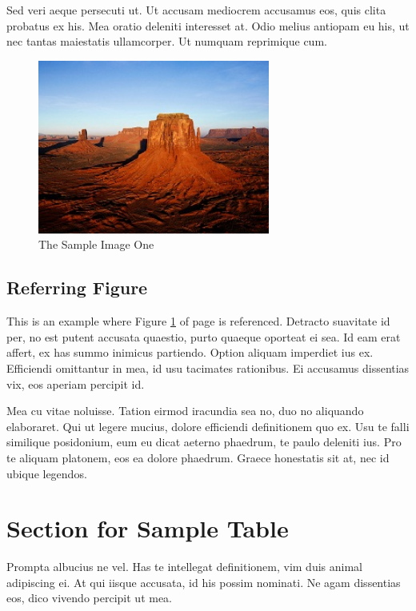Sed veri aeque persecuti ut. Ut accusam mediocrem accusamus eos, quis clita probatus ex his. Mea oratio deleniti interesset at. Odio melius antiopam eu his, ut nec tantas maiestatis ullamcorper. Ut numquam reprimique cum.

\begin{figure}[tbh] %
\begin{center}
	\includegraphics[width = 3in]{images/sampleImage1.jpg}
	\caption{The Sample Image One} %
	\label{figSample1} %
\end{center}
\end{figure}

\subsection{Referring Figure}
This is an example where Figure \ref{figSample1} of page \pageref{figSample1} is referenced. Detracto suavitate id per, no est putent accusata quaestio, purto quaeque oporteat ei sea. Id eam erat affert, ex has summo inimicus partiendo. Option aliquam imperdiet ius ex. Efficiendi omittantur in mea, id usu tacimates rationibus. Ei accusamus dissentias vix, eos aperiam percipit id.

Mea cu vitae noluisse. Tation eirmod iracundia sea no, duo no aliquando elaboraret. Qui ut legere mucius, dolore efficiendi definitionem quo ex. Usu te falli similique posidonium, eum eu dicat aeterno phaedrum, te paulo deleniti ius. Pro te aliquam platonem, eos ea dolore phaedrum. Graece honestatis sit at, nec id ubique legendos.

\section{Section for Sample Table}
Prompta albucius ne vel. Has te intellegat definitionem, vim duis animal adipiscing ei. At qui iisque accusata, id his possim nominati. Ne agam dissentias eos, dico vivendo percipit ut mea.

